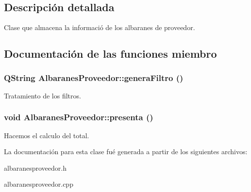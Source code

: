 \subsection{Descripci\'{o}n detallada}
Clase que almacena la informaci\'{o} de los albaranes de proveedor. 



\subsection{Documentaci\'{o}n de las funciones miembro}
\subsubsection{\setlength{\rightskip}{0pt plus 5cm}QString Albaranes\-Proveedor::genera\-Filtro ()}\label{classAlbaranesProveedor_a3}


Tratamiento de los filtros. 
\subsubsection{\setlength{\rightskip}{0pt plus 5cm}void Albaranes\-Proveedor::presenta ()}\label{classAlbaranesProveedor_a11}


Hacemos el calculo del total. 

La documentaci\'{o}n para esta clase fu\'{e} generada a partir de los siguientes archivos:\begin{CompactItemize}
\item 
albaranesproveedor.h\item 
albaranesproveedor.cpp\end{CompactItemize}
